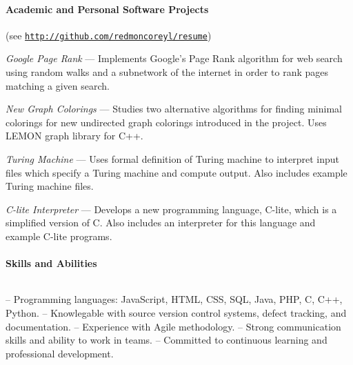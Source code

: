 \documentclass{article}
\begin{document}
  \setlength{\parskip}{0.0in}
  \paragraph{Academic and Personal Software Projects} \hfill (see \href{http://github.com/redmoncoreyl/resume}{\texttt{http://github.com/redmoncoreyl/resume}})%
  \setlength{\parskip}{0.1in}

  \hangindent=0.5in
  \textit{Google Page Rank} --- Implements Google's Page Rank algorithm
  for web search using random walks and a subnetwork of the internet in order to
  rank pages matching a given search.

  \hangindent=0.5in
	\textit{New Graph Colorings} --- Studies two alternative algorithms for
  finding minimal colorings for new undirected graph colorings introduced in the project. Uses LEMON
  graph library for C++.

  \hangindent=0.5in
	\textit{Turing Machine} --- Uses formal definition of Turing machine to
  interpret input files which specify a Turing machine and compute output. Also includes
  example Turing machine files.

  \hangindent=0.5in
	\textit{C-lite Interpreter} --- Develops a new programming language, C-lite, which
  is a simplified version of C. Also includes an interpreter for this language and
  example C-lite programs.

  \setlength{\parskip}{0.0in}
  \paragraph{Skills and Abilities} $ $
  \setlength{\parskip}{0.1in}

  \hangindent=0.4in
  -- Programming languages: JavaScript, HTML, CSS, SQL, Java, PHP, C, C++, Python. \newline
  -- Knowlegable with source version control systems, defect tracking, and documentation. \newline
  -- Experience with Agile methodology. \newline
  -- Strong communication skills and ability to work in teams. \newline
  -- Committed to continuous learning and professional development.
\end{document}
